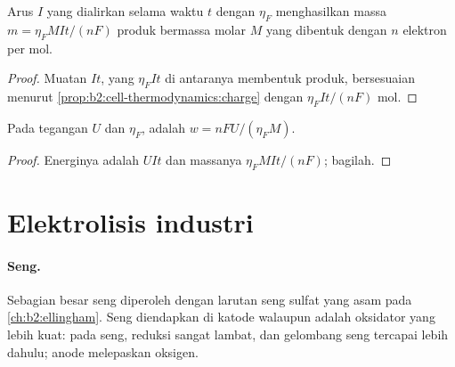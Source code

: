 \begin{proposition}\label{prop:b2:batteries-electrolysis:faraday-mass}
Arus $I$ yang dialirkan selama waktu $t$ dengan  $\eta_F$
menghasilkan massa $m = \eta_F MIt/(nF)$ produk bermassa molar $M$ yang
dibentuk dengan $n$ elektron per mol.
\end{proposition}

\begin{proof}
Muatan $It$, yang $\eta_F It$ di antaranya membentuk produk, bersesuaian
menurut \cref{prop:b2:cell-thermodynamics:charge} dengan $\eta_F It/(nF)$
mol.
\end{proof}

\begin{proposition}\label{prop:b2:batteries-electrolysis:energy}
Pada tegangan $U$ dan  $\eta_F$,  adalah $w = nFU/(\eta_F M)$.
\end{proposition}

\begin{proof}
Energinya adalah $UIt$ dan massanya $\eta_F MIt/(nF)$; bagilah.
\end{proof}

\section{Elektrolisis industri}

\paragraph{Seng.} Sebagian besar seng diperoleh dengan  larutan
seng sulfat yang asam pada \cref{ch:b2:ellingham}. Seng diendapkan di katode
walaupun  adalah oksidator yang lebih kuat: pada seng, reduksi
 sangat lambat, dan gelombang seng tercapai lebih dahulu; anode
melepaskan oksigen.

